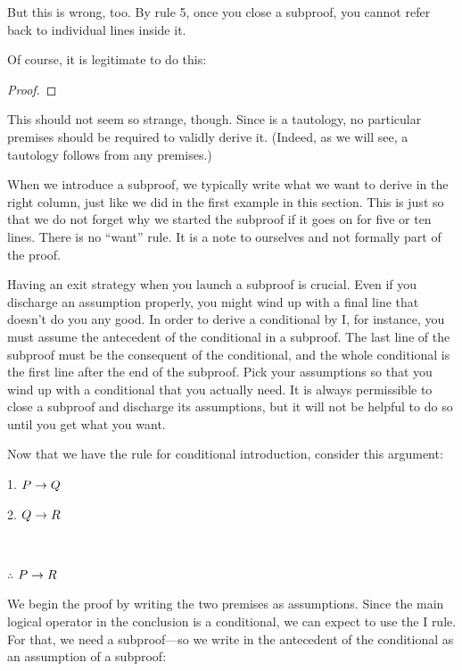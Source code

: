 But this is wrong, too. By rule 5, once you close a subproof, you cannot refer back to individual lines inside it.

Of course, it is legitimate to do this:

\begin{proof}
	\open
		 
	\close
	 
\end{proof}

This should not seem so strange, though. Since \eif{} is a tautology, no particular premises should be required to validly derive it. (Indeed, as we will see, a tautology follows from any premises.)

When we introduce a subproof, we typically write what we want to derive in the right column, just like we did in the first example in this section. This is just so that we do not forget why we started the subproof if it goes on for five or ten lines. There is no ``want'' rule. It is a note to ourselves and not formally part of the proof.

Having an exit strategy when you launch a subproof is crucial. Even if you discharge an assumption properly, you might wind up with a final line that doesn't do you any good. In order to derive a conditional by {\eif}I, for instance, you must assume the antecedent of the conditional in a subproof. The last line of the subproof must be the consequent of the conditional, and the whole conditional is the first line after the end of the subproof. Pick your assumptions so that you wind up with a conditional that you actually need. It is always permissible to close a subproof and discharge its assumptions, but it will not be helpful to do so until you get what you want.


Now that we have the rule for conditional introduction, consider this argument:
\label{proofHS}
\begin{earg}
\item[1.] $P \rightarrow Q$
\item[2.] $Q \rightarrow R$
\item[] \textcolor{white}{.}\sout{\hspace{.1\linewidth}} \textcolor{white}{.}
\item[$\therefore$] $P \rightarrow R$
\end{earg}
We begin the proof by writing the two premises as assumptions. Since the main logical operator in the conclusion is a conditional, we can expect to use the {\eif}I rule. For that, we need a subproof---so we write in the antecedent of the conditional as an assumption of a subproof:

